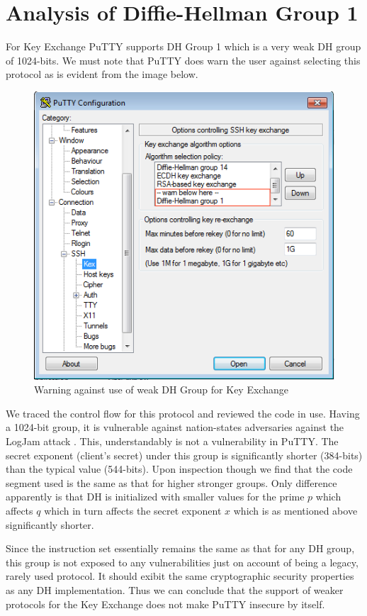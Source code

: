 \documentclass{report}
\begin{document}
\section{Analysis of Diffie-Hellman Group 1}
For Key Exchange PuTTY supports DH Group 1 which is a very weak DH group of 1024-bits. We must note that PuTTY does warn the user against selecting this protocol as is evident from the image below.
\begin{figure}[ht]
\caption{Warning against use of weak DH Group for Key Exchange}
\centering
\includegraphics[width=1\textwidth]{legacy.png}
\end{figure}
We traced the control flow for this protocol and reviewed the code in use. Having a 1024-bit group, it is vulnerable against nation-states adversaries against the LogJam attack \cite{adrian}. This, understandably is not a vulnerability in PuTTY. The secret exponent (client's secret) under this group is significantly shorter (384-bits) than the typical value (544-bits). Upon inspection though we find that the code segment used is the same as that for higher stronger groups. Only difference apparently is that DH is initialized with smaller values for the prime \(p\) which affects \(q\) which in turn affects the secret exponent \(x\) which is as mentioned above significantly shorter. \par
Since the instruction set essentially remains the same as that for any DH group, this group is not exposed to any vulnerabilities just on account of being a legacy, rarely used protocol. It should exibit the same cryptographic security properties as any DH implementation. Thus we can conclude that the support of weaker protocols for the Key Exchange does not make PuTTY insecure by itself.
\end{document}
